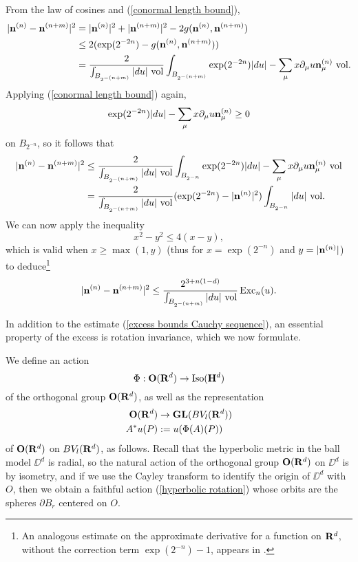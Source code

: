 From the law of cosines and (\ref{conormal length bound}),
\begin{align*}
|\mathbf n^{(n)} - \mathbf n^{(n + m)}|^2 &= |\mathbf n^{(n)}|^2 + |\mathbf n^{(n + m)}|^2 - 2 g(\mathbf n^{(n)}, \mathbf n^{(n + m)})\\
&\leq 2(\exp(2^{-2n}) - g(\mathbf n^{(n)}, \mathbf n^{(n + m)})) \\
&= \frac{2}{\int_{B_{2^{-(n + m)}}} |du| ~\mathrm{vol}} \int_{B_{2^{-(n + m)}}} \exp(2^{-2n}) |du| - \sum_\mu x \partial_\mu u \mathbf n_\mu^{(n)} ~\mathrm{vol}.
\end{align*}
Applying (\ref{conormal length bound}) again,
$$\exp(2^{-2n}) |du| - \sum_\mu x \partial_\mu u \mathbf n_\mu^{(n)} \geq 0$$
on $B_{2^{-n}}$, so it follows that
\begin{align*}
|\mathbf n^{(n)} - \mathbf n^{(n + m)}|^2 &\leq \frac{2}{\int_{B_{2^{-(n + m)}}} |du| ~\mathrm{vol}} \int_{B_{2^{-n }}} \exp(2^{-2n}) |du| - \sum_\mu x \partial_\mu u \mathbf n_\mu^{(n)} ~\mathrm{vol}\\
&= \frac{2}{\int_{B_{2^{-(n + m)}}} |du| ~\mathrm{vol}} (\exp(2^{-2n}) - |\mathbf n^{(n)}|^2) \int_{B_{2^{-n}}} |du| ~\mathrm{vol}.
\end{align*}
We can now apply the inequality
$$x^2 - y^2 \leq 4(x - y),$$
which is valid when $x \geq \max(1, y)$ (thus for $x = \exp(2^{-n})$ and $y = |\mathbf n^{(n)}|$)
to deduce\footnote{An analogous estimate on the approximate derivative for a function on $\mathbf{R}^d$, without the correction term $\exp(2^{-n}) - 1$, appears in \cite[pg661]{Miranda66}.}
\begin{equation}\label{excess bounds Cauchy sequence}
|\mathbf n^{(n)} - \mathbf n^{(n + m)}|^2 \leq \frac{2^{3 + n(1 - d)}}{\int_{B_{2^{-(n + m)}}} |du| ~\mathrm{vol}} \operatorname{Exc}_n(u).
\end{equation}

In addition to the estimate (\ref{excess bounds Cauchy sequence}), an essential property of the excess is rotation invariance, which we now formulate.

\begin{notation}
We define an action
\begin{equation}\label{hyperbolic rotation}
    \Phi: \mathbf{O}(\mathbf{R}^d) \to \operatorname{Iso}(\mathbf H^d)
\end{equation}
of the orthogonal group $\mathbf{O}(\mathbf{R}^d)$, as well as the representation
\begin{align*}
\mathbf{O}(\mathbf{R}^d) &\to \mathbf{GL}(BV_l(\mathbf{R}^d))\\
A^* u(P) &:= u(\Phi(A)(P))
\end{align*}
of $\mathbf{O}(\mathbf{R}^d)$ on $BV_l(\mathbf{R}^d)$, as follows.
Recall that the hyperbolic metric in the ball model $\DD^d$ is radial, so the natural action of the orthogonal group $\mathbf{O}(\mathbf{R}^d)$ on $\DD^d$ is by isometry, and if we use the Cayley transform to identify the origin of $\DD^d$ with $O$, then we obtain a faithful action (\ref{hyperbolic rotation}) whose orbits are the spheres $\partial B_r$ centered on $O$.
\end{notation}

